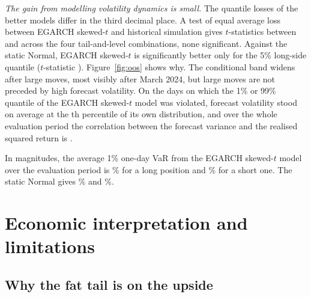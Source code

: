 \documentclass[11pt,a4paper]{article}
\begin{document}
\emph{The gain from modelling volatility dynamics is small.} The quantile losses of the better models differ in the third decimal place. A \citet{dieboldmariano1995} test of equal average loss between EGARCH skewed-$t$ and historical simulation gives $t$-statistics between \dmHSROne{} and \dmHSLFive{} across the four tail-and-level combinations, none significant. Against the static Normal, EGARCH skewed-$t$ is significantly better only for the 5\% long-side quantile ($t$-statistic \dmNormalLFive). Figure~\ref{fig:oos} shows why. The conditional band widens after large moves, most visibly after March 2024, but large moves are not preceded by high forecast volatility. On the \violN{} days on which the 1\% or 99\% quantile of the EGARCH skewed-$t$ model was violated, forecast volatility stood on average at the \violSigRank th percentile of its own distribution, and over the whole evaluation period the correlation between the forecast variance and the realised squared return is \corrSigR.

In magnitudes, the average 1\% one-day VaR from the EGARCH skewed-$t$ model over the evaluation period is \avgVarESL\% for a long position and \avgVarESR\% for a short one. The static Normal gives \avgVarNL\% and \avgVarNR\%.

\section{Economic interpretation and limitations}\label{sec:disc}

\subsection{Why the fat tail is on the upside}
\end{document}
